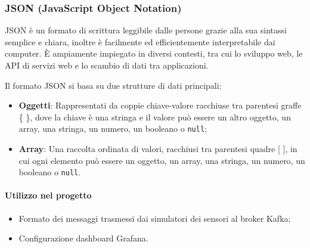 \subsubsection{JSON (JavaScript Object Notation)}
JSON è un formato di scrittura leggibile dalle persone grazie alla sua sintassi semplice e chiara, inoltre è facilmente ed efficientemente interpretabile dai computer. È ampiamente impiegato in diversi contesti, tra cui lo sviluppo web, le API di servizi web e lo scambio di dati tra applicazioni.

Il formato JSON si basa su due strutture di dati principali:

\begin{itemize}
  \item \textbf{Oggetti}: Rappresentati da coppie chiave-valore racchiuse tra parentesi graffe \{ \}, dove la chiave è una stringa e il valore può essere un altro oggetto, un array, una stringa, un numero, un booleano o \texttt{null};
  \item \textbf{Array}: Una raccolta ordinata di valori, racchiusi tra parentesi quadre [ ], in cui ogni elemento può essere un oggetto, un array, una stringa, un numero, un booleano o \texttt{null}.
\end{itemize}

\paragraph{Utilizzo nel progetto}
\begin{itemize}
  \item Formato dei messaggi trasmessi dai simulatori dei sensori al broker Kafka;
  \item Configurazione dashboard Grafana.
\end{itemize}
